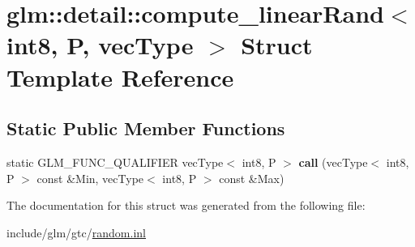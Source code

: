 \hypertarget{structglm_1_1detail_1_1compute__linearRand_3_01int8_00_01P_00_01vecType_01_4}{}\section{glm\+:\+:detail\+:\+:compute\+\_\+linear\+Rand$<$ int8, P, vec\+Type $>$ Struct Template Reference}
\label{structglm_1_1detail_1_1compute__linearRand_3_01int8_00_01P_00_01vecType_01_4}
\subsection*{Static Public Member Functions}
\begin{DoxyCompactItemize}
\item 
\mbox{\label{structglm_1_1detail_1_1compute__linearRand_3_01int8_00_01P_00_01vecType_01_4_a0ce1c78af3d0d236a2bf50646d60bc8b}} 
static G\+L\+M\+\_\+\+F\+U\+N\+C\+\_\+\+Q\+U\+A\+L\+I\+F\+I\+ER vec\+Type$<$ int8, P $>$ {\bfseries call} (vec\+Type$<$ int8, P $>$ const \&Min, vec\+Type$<$ int8, P $>$ const \&Max)
\end{DoxyCompactItemize}


The documentation for this struct was generated from the following file\+:\begin{DoxyCompactItemize}
\item 
include/glm/gtc/\hyperlink{random_8inl}{random.\+inl}\end{DoxyCompactItemize}
